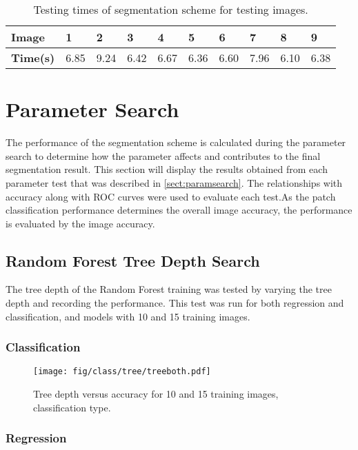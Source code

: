 \begin{table}[H]
\centering
\caption{Testing times of segmentation scheme for testing images.}

\begin{tabular}{|l|l|l|l|l|l|l|l|l|l|}
\hline
\textbf{Image}	& \textbf{1} & \textbf{2} & \textbf{3} & \textbf{4} & \textbf{5} &\textbf{6} &\textbf{7} & \textbf{8} &\textbf{9}\\
\hline
\textbf{Time(s)} & 6.85 & 9.24 & 6.42 & 6.67 & 6.36 & 6.60 & 7.96 & 6.10 & 6.38\\
\hline				    	 			   			    	 
\end{tabular}
\label{table:times}
\end{table}

\section{Parameter Search}
The performance of the segmentation scheme is calculated during the parameter search to determine how the parameter affects and contributes to the final segmentation result. This section will display the results obtained from each parameter test that was described in \ref{sect:paramsearch}. The relationships with accuracy along with ROC curves were used to evaluate each test.As the patch classification performance determines the overall image accuracy, the performance is evaluated by the image accuracy.

\subsection{Random Forest Tree Depth Search}
The tree depth of the Random Forest training was tested by varying the tree depth and recording the performance. This test was run for both regression and classification, and models with 10 and 15 training images. 

\subsubsection{Classification}
\begin{figure}[H]
\centering
\texttt{[image: fig/class/tree/treeboth.pdf]}
\caption{Tree depth versus accuracy for 10 and 15 training images, classification type.}
\label{class:tree}
\end{figure}

\subsubsection{Regression}

